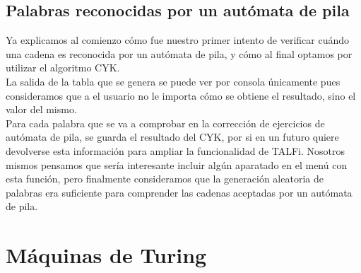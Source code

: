 \documentclass[12pt,a4paper,spanish]{book}
\begin{document}
\subsection{Palabras reconocidas por un aut\'omata de pila}
Ya explicamos al comienzo c\'omo fue nuestro primer intento de verificar cu\'ando una cadena es reconocida por un aut\'omata de pila, y c\'omo al final  optamos por utilizar el algoritmo CYK.\\
La salida de la tabla que se genera se puede ver por consola \'unicamente pues consideramos que a el usuario no le importa c\'omo se obtiene el resultado, sino el valor del mismo. \\
Para cada palabra que se va a comprobar en la correcci\'on de ejercicios de aut\'omata de pila, se guarda el resultado del CYK, por si en un futuro quiere devolverse esta informaci\'on para ampliar la funcionalidad de TALFi. Nosotros mismos pensamos que ser\'ia interesante incluir alg\'un aparatado en el men\'u con esta funci\'on, pero finalmente consideramos que la generaci\'on aleatoria de palabras era suficiente para comprender las cadenas aceptadas por un aut\'omata de pila.


\newpage
\section{M\'aquinas de Turing}
\end{document}
